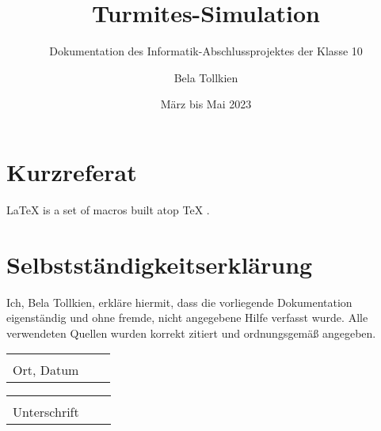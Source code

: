 \documentclass[
	fontsize=12pt,
	paper=a4,
	pagesize=auto,
	parskip=half,
    titlepage=true,
	ngerman
]{scrartcl}
\begin{document}
\title{
	Turmites-Simulation
}
\subtitle{
	Dokumentation des Informatik-Abschlussprojektes der Klasse 10
}
\author{
	Bela Tollkien
}
\date{März bis Mai 2023}

\maketitle

\tableofcontents

\section*{Kurzreferat}




\LaTeX{} \cite{latex2e} is a set of macros built atop \TeX{} \cite{texbook}.




\section*{Selbstständigkeitserklärung}
Ich, Bela Tollkien, erkläre hiermit, dass die vorliegende Dokumentation eigenständig und ohne fremde, nicht angegebene Hilfe verfasst wurde. Alle verwendeten Quellen wurden korrekt zitiert und ordnungsgemäß angegeben.

\vspace{2cm}

\noindent

\begin{tabular}{p{5cm}p{.5cm}l}
	\dotfill \\ 
	Ort, Datum
\end{tabular}
\hfill
\begin{tabular}{p{5cm}p{.5cm}l}
	\dotfill \\ 
	Unterschrift
\end{tabular}
\end{document}
